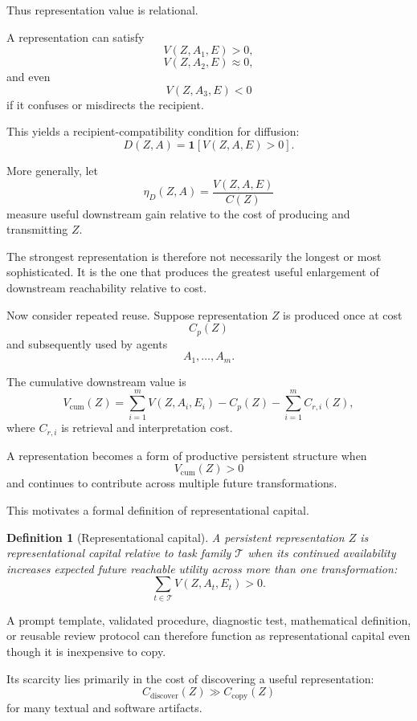 \documentclass[11pt]{article}
\newtheorem{definition}{Definition}[section]
\begin{document}
Thus representation value is relational.

A representation can satisfy
\[
    V(Z,A_1,E)>0,
\]
\[
    V(Z,A_2,E)\approx0,
\]
and even
\[
    V(Z,A_3,E)<0
\]
if it confuses or misdirects the recipient.

This yields a recipient-compatibility condition for diffusion:
\[
    D(Z,A)
    =
    \mathbf{1}
    [
        V(Z,A,E)>0
    ].
\]

More generally, let
\[
    \eta_D(Z,A)
    =
    \frac{
        V(Z,A,E)
    }{
        C(Z)
    }
\]
measure useful downstream gain relative to the cost of producing and transmitting \(Z\).

The strongest representation is therefore not necessarily the longest or most sophisticated. It is the one that produces the greatest useful enlargement of downstream reachability relative to cost.

Now consider repeated reuse. Suppose representation \(Z\) is produced once at cost
\[
    C_p(Z)
\]
and subsequently used by agents
\[
    A_1,\ldots,A_m.
\]

The cumulative downstream value is
\[
    V_{\mathrm{cum}}(Z)
    =
    \sum_{i=1}^{m}
    V(Z,A_i,E_i)
    -
    C_p(Z)
    -
    \sum_{i=1}^{m}C_{r,i}(Z),
\]
where \(C_{r,i}\) is retrieval and interpretation cost.

A representation becomes a form of productive persistent structure when
\[
    V_{\mathrm{cum}}(Z)>0
\]
and continues to contribute across multiple future transformations.

This motivates a formal definition of representational capital.

\begin{definition}[Representational capital]
A persistent representation \(Z\) is representational capital relative to task family \(\mathcal{T}\) when its continued availability increases expected future reachable utility across more than one transformation:
\[
    \sum_{t\in\mathcal{T}}
    V(Z,A_t,E_t)>0.
\]
\end{definition}

A prompt template, validated procedure, diagnostic test, mathematical definition, or reusable review protocol can therefore function as representational capital even though it is inexpensive to copy.

Its scarcity lies primarily in the cost of discovering a useful representation:
\[
    C_{\mathrm{discover}}(Z)
    \gg
    C_{\mathrm{copy}}(Z)
\]
for many textual and software artifacts.
\end{document}
